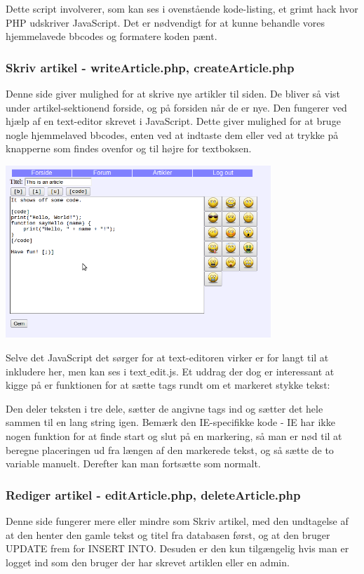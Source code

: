 \documentclass{article}
\begin{document}


Dette script involverer, som kan ses i ovenstående kode-listing, et grimt hack hvor PHP udskriver JavaScript. Det er nødvendigt for at kunne behandle vores hjemmelavede bbcodes og formatere koden pænt.

\subsubsection[Skriv artikel]{Skriv artikel - writeArticle.php, createArticle.php}
Denne side giver mulighed for at skrive nye artikler til siden. De bliver så vist under artikel-sektionend forside, og på forsiden når de er nye. Den fungerer ved hjælp af en text-editor skrevet i JavaScript. Dette giver mulighed for at bruge nogle hjemmelaved bbcodes, enten ved at indtaste dem eller ved at trykke på knapperne som findes ovenfor og til højre for textboksen.

\includegraphics[width=100mm]{mi04.png}

Selve det JavaScript det sørger for at text-editoren virker er for langt til at inkludere her, men kan ses i text$\_$edit.js. Et uddrag der dog er interessant at kigge på er funktionen for at sætte tags rundt om et markeret stykke tekst:



Den deler teksten i tre dele, sætter de angivne tags ind og sætter det hele sammen til en lang string igen. Bemærk den IE-specifikke kode - IE har ikke nogen funktion for at finde start og slut på en markering, så man er nød til at beregne placeringen ud fra længen af den markerede tekst, og så sætte de to variable manuelt. Derefter kan man fortsætte som normalt.

\subsubsection[Rediger artikel]{Rediger artikel - editArticle.php, deleteArticle.php}
Denne side fungerer mere eller mindre som Skriv artikel, med den undtagelse af at den henter den gamle tekst og titel fra databasen først, og at den bruger UPDATE frem for INSERT INTO. Desuden er den kun tilgængelig hvis man er logget ind som den bruger der har skrevet artiklen eller en admin.
\end{document}
